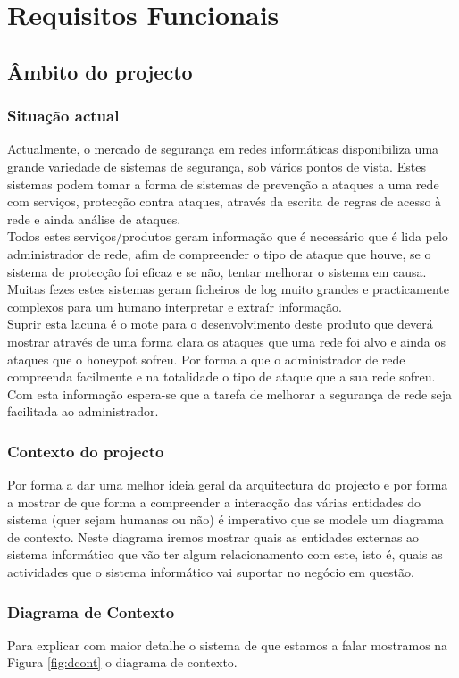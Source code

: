 \chapter{Requisitos Funcionais}
\minitoc
\section{Âmbito do projecto}
\subsection{Situação actual}
Actualmente, o mercado de segurança em redes informáticas disponibiliza uma grande variedade de sistemas de segurança, sob vários pontos de vista.
Estes sistemas podem tomar a forma de sistemas de prevenção a ataques a uma rede com serviços, protecção contra ataques, através da
escrita de regras de acesso à rede e ainda análise de ataques.\\
Todos estes serviços/produtos geram informação que é necessário que é lida pelo administrador de rede, afim de compreender o tipo de ataque que houve,
se o sistema de protecção foi eficaz e se não, tentar melhorar o sistema em causa.\\
Muitas fezes estes sistemas geram ficheiros de log muito grandes e practicamente complexos para um humano interpretar e extraír informação.\\
Suprir esta lacuna é o mote para o desenvolvimento deste produto que deverá mostrar através de uma forma clara os ataques que uma rede foi alvo
e ainda os ataques que o honeypot sofreu. Por forma a que o administrador de rede compreenda facilmente e na totalidade o tipo de ataque que a sua rede sofreu.
Com esta informação espera-se que a tarefa de melhorar a segurança de rede seja facilitada ao administrador.

\subsection{Contexto do projecto}
Por forma a dar uma melhor ideia geral da arquitectura do projecto e por forma a mostrar de que forma a compreender
a interacção das várias entidades do sistema (quer sejam humanas ou não) é imperativo que se modele um diagrama de contexto.
Neste diagrama iremos mostrar quais as entidades externas ao sistema informático que vão ter algum relacionamento com este, 
isto é, quais as actividades que o sistema informático vai suportar no negócio em questão. 

\subsection{Diagrama de Contexto}
Para explicar com maior detalhe o sistema de que estamos a falar mostramos na Figura \ref{fig:dcont} o diagrama de contexto.

